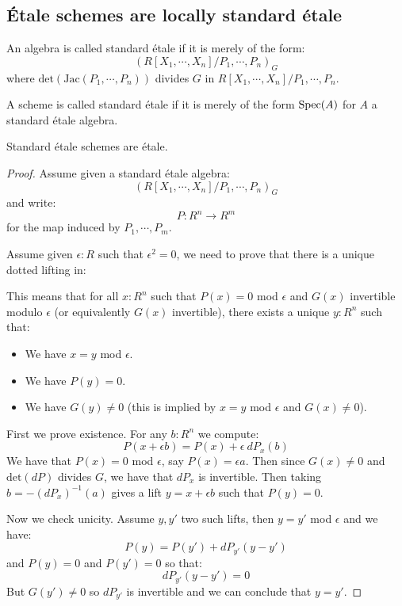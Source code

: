 \subsection{Étale schemes are locally standard étale}

\begin{definition}
An algebra is called standard étale if it is merely of the form:
\[(R[X_1,\cdots,X_n]/P_1,\cdots,P_n)_G\]
where $\mathrm{det}(\mathrm{Jac}(P_1,\cdots,P_n))$ divides $G$ in $R[X_1,\cdots,X_n]/P_1,\cdots,P_n$.
\end{definition}

\begin{definition}
A scheme is called standard étale if it is merely of the form $\operatorname{Spec}(A)$ for $A$ a standard étale algebra.
\end{definition}

\begin{lemma}
Standard étale schemes are étale.
\end{lemma}

\begin{proof}
Assume given a standard étale algebra:
\[(R[X_1,\cdots,X_n]/P_1,\cdots,P_n)_G\]
and write:
\[P:R^n\to R^m\]
for the map induced by $P_1,\cdots,P_m$.

Assume given $\epsilon:R$ such that $\epsilon^2=0$, we need to prove that there is a unique dotted lifting in:
  \begin{center}
    \end{center}
This means that for all $x:R^n$ such that $P(x)=0$ mod $\epsilon$ and $G(x)$ invertible modulo $\epsilon$ (or equivalently $G(x)$ invertible), there exists a unique $y:R^n$ such that:
\begin{itemize} 
\item We have $x=y$ mod $\epsilon$.
\item We have $P(y)=0$.
\item We have $G(y)\not=0$ (this is implied by $x=y$ mod $\epsilon$ and $G(x)\not=0$).
\end{itemize}

First we prove existence. For any $b:R^n$ we compute:
\[P(x+\epsilon b) = P(x) + \epsilon\ dP_x(b)\]
We have that $P(x)=0$ mod $\epsilon$, say $P(x) = \epsilon a$. Then since $G(x)\not=0$ and $\mathrm{det}(dP)$ divides $G$, we have that $dP_x$ is invertible. Then taking $b = -(dP_x)^{-1}(a)$ gives a lift $y=x+\epsilon b$ such that $P(y) = 0$.

Now we check unicity. Assume $y,y'$ two such lifts, then $y=y'$ mod $\epsilon$ and we have:
\[P(y) = P(y') + dP_{y'}(y-y')\]
and $P(y)=0$ and $P(y')=0$ so that:
\[dP_{y'}(y-y') = 0\]
But $G(y')\not=0$ so $dP_{y'}$ is invertible and we can conclude that $y=y'$.
\end{proof}

